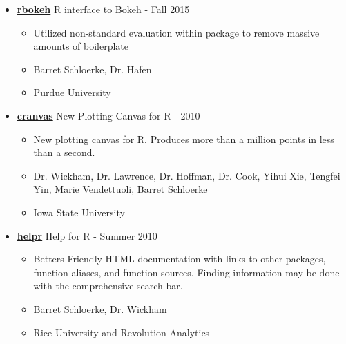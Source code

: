 \documentclass[oneside]{article}
\begin{document}
\begin{itemize}
      \item{\bf \href{http://hafen.github.io/rbokeh/}{rbokeh}} R interface to Bokeh - Fall 2015
        \begin{itemize}
          \item Utilized non-standard evaluation within package to remove massive amounts of boilerplate
          \item Barret Schloerke, Dr. Hafen
          \item Purdue University
        \end{itemize}

      \item{\bf \href{http://github.com/ggobi/cranvas/}{cranvas}} New Plotting Canvas for R - 2010
        \begin{itemize}
          \item New plotting canvas for R.  Produces more than a million points in less than a second.
          \item Dr. Wickham, Dr. Lawrence, Dr. Hoffman, Dr. Cook, Yihui Xie, Tengfei Yin, Marie Vendettuoli, Barret Schloerke
          \item Iowa State University
        \end{itemize}

      \item{\bf \href{http://github.com/hadley/helpr/}{helpr}} Help for R - Summer 2010
        \begin{itemize}
          \item Betters Friendly HTML documentation with links to other packages, function aliases, and function sources.  Finding information may be done with the comprehensive search bar.
          \item Barret Schloerke, Dr. Wickham
          \item Rice University and Revolution Analytics
        \end{itemize}



\end{itemize}
\end{document}
